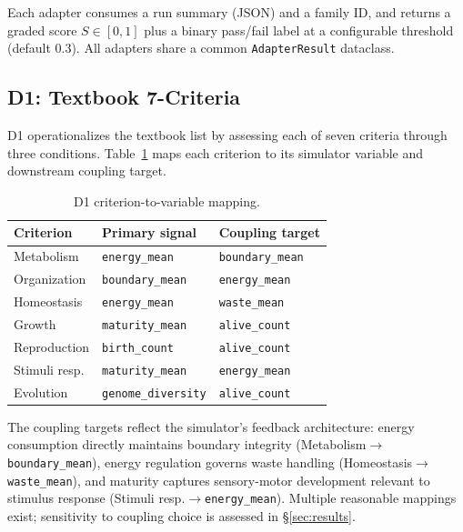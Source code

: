 \documentclass[letterpaper]{article}
\begin{document}
Each adapter consumes a run summary (JSON) and a family ID, and returns a
graded score $S \in [0, 1]$ plus a binary pass/fail label at a configurable
threshold (default 0.3).  All adapters share a common \texttt{AdapterResult}
dataclass.

\subsection{D1: Textbook 7-Criteria}

D1 operationalizes the textbook list
\citep{campbell_2017_biology} by assessing each of seven criteria
through three conditions.  Table~\ref{tab:d1_mapping} maps each criterion
to its simulator variable and downstream coupling target.

\begin{table}[t]
\centering
\small
\caption{D1 criterion-to-variable mapping.}
\label{tab:d1_mapping}
\begin{tabular}{@{}lll@{}}
\toprule
Criterion & Primary signal & Coupling target \\
\midrule
Metabolism     & \texttt{energy\_mean}   & \texttt{boundary\_mean} \\
Organization   & \texttt{boundary\_mean} & \texttt{energy\_mean} \\
Homeostasis    & \texttt{energy\_mean}   & \texttt{waste\_mean} \\
Growth         & \texttt{maturity\_mean} & \texttt{alive\_count} \\
Reproduction   & \texttt{birth\_count}   & \texttt{alive\_count} \\
Stimuli resp.  & \texttt{maturity\_mean} & \texttt{energy\_mean} \\
Evolution      & \texttt{genome\_diversity} & \texttt{alive\_count} \\
\bottomrule
\end{tabular}
\end{table}

The coupling targets reflect the simulator's feedback architecture: energy
consumption directly maintains boundary integrity (Metabolism$\to$\texttt{boundary\_mean}),
energy regulation governs waste handling (Homeostasis$\to$\texttt{waste\_mean}),
and maturity captures sensory-motor development relevant to stimulus response
(Stimuli resp.$\to$\texttt{energy\_mean}).  Multiple reasonable mappings exist;
sensitivity to coupling choice is assessed in \S\ref{sec:results}.
\end{document}
